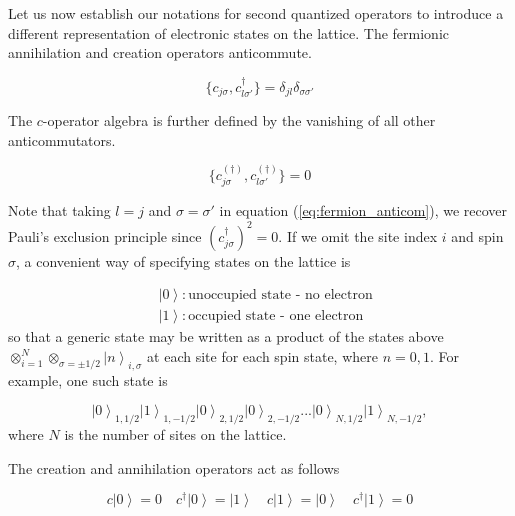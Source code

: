 Let us now establish our notations for second quantized operators to introduce a different representation of electronic states on the lattice. The fermionic annihilation and creation operators anticommute.

\begin{equation}
\{ c_{j\sigma} , c_{l \sigma'}^\dagger \} = \delta_{jl} \delta_{\sigma\sigma'}
\end{equation}

The $c$-operator algebra is further defined by the vanishing of all other anticommutators.

\begin{equation}\label{eq:fermion_anticom}
\{ c_{j\sigma}^{(\dagger)} , c_{l \sigma'}^{(\dagger)} \} = 0
\end{equation}

Note that taking $l = j$ and $\sigma = \sigma'$ in equation (\ref{eq:fermion_anticom}), we recover Pauli's exclusion principle since $(c_{j\sigma}^\dagger)^2 = 0$. If we omit the site index $i$ and spin $\sigma$, a convenient way of specifying states on the lattice is

\begin{equation}
\begin{split}
&\left| 0 \right\rangle : \text{unoccupied state - no electron} \\
&\left| 1 \right\rangle : \text{occupied state - one electron}
\end{split}
\end{equation}
so that a generic state may be written as a product of the states above $\otimes_{i=1}^{N} \otimes_{\sigma = \pm 1/2} \left| n \right\rangle_{i, \sigma}$ at each site for each spin state, where $n= 0, 1$. For example, one such state is

\begin{equation}
\left| 0 \right\rangle_{1, 1/2} \left| 1 \right\rangle_{1, -1/2} \left| 0 \right\rangle_{2, 1/2} \left| 0 \right\rangle_{2, -1/2} ... \left| 0 \right\rangle_{N, 1/2} \left| 1 \right\rangle_{N, -1/2}  ,
\end{equation}
where $N$ is the number of sites on the lattice.

The creation and annihilation operators act as follows

\begin{equation}
c \left| 0 \right\rangle = 0 \quad c^\dagger \left| 0 \right\rangle = \left| 1 \right\rangle \quad c \left| 1 \right\rangle = \left| 0 \right\rangle \quad c^\dagger \left| 1 \right\rangle = 0
\end{equation}

